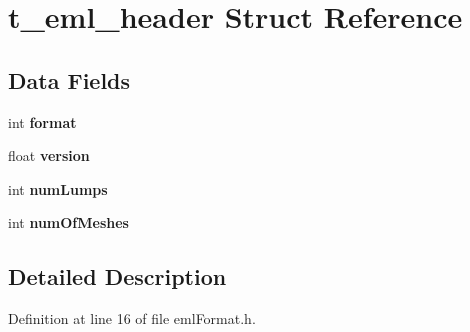 \hypertarget{structt__eml__header}{}\section{t\+\_\+eml\+\_\+header Struct Reference}
\label{structt__eml__header}
\subsection*{Data Fields}
\begin{DoxyCompactItemize}
\item 
int {\bfseries format}\hypertarget{structt__eml__header_ae8c8d155cc1f3aeff2371ceaf775e1a3}{}\label{structt__eml__header_ae8c8d155cc1f3aeff2371ceaf775e1a3}

\item 
float {\bfseries version}\hypertarget{structt__eml__header_a6c9e58ca77e768fbd00b73fec779085f}{}\label{structt__eml__header_a6c9e58ca77e768fbd00b73fec779085f}

\item 
int {\bfseries num\+Lumps}\hypertarget{structt__eml__header_ac1bf5d5401a45b7dbb8dfd7d0983561f}{}\label{structt__eml__header_ac1bf5d5401a45b7dbb8dfd7d0983561f}

\item 
int {\bfseries num\+Of\+Meshes}\hypertarget{structt__eml__header_a53920bd38d11c370208591bfca752479}{}\label{structt__eml__header_a53920bd38d11c370208591bfca752479}

\end{DoxyCompactItemize}


\subsection{Detailed Description}


Definition at line 16 of file eml\+Format.\+h.

